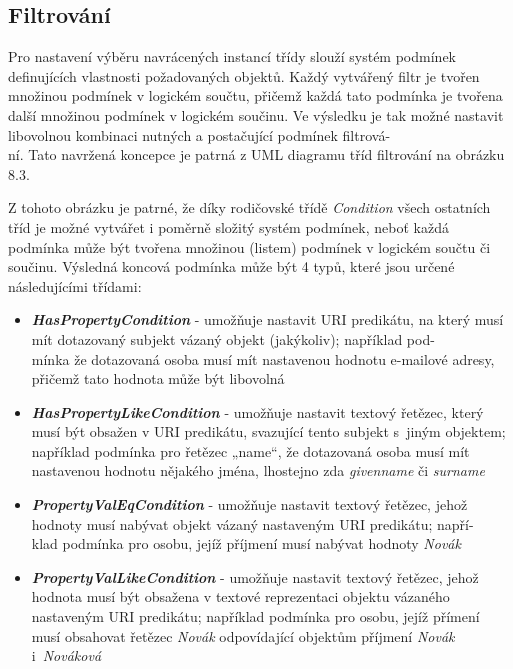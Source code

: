 \documentclass{projekt}
\begin{document}
\subsection{Filtrování}
\hspace{0.65cm}Pro nastavení výběru navrácených instancí třídy slouží systém podmínek definujících vlastnosti požadovaných objektů. Každý vytvářený filtr je tvořen množinou podmínek v logickém součtu, přičemž každá tato podmínka je tvořena další množinou podmínek v logickém součinu. Ve výsledku je tak možné nastavit libovolnou kombinaci nutných a postačující podmínek filtrová-\\ní. Tato navržená koncepce je patrná z UML diagramu tříd filtrování na obrázku 8.3.

Z tohoto obrázku je patrné, že díky rodičovské třídě {\it Condition} všech ostatních tříd je možné vytvářet i poměrně složitý systém podmínek, neboť každá podmínka může být tvořena množinou (listem) podmínek v logickém součtu či součinu. Výsledná koncová podmínka může být 4 typů, které jsou určené následujícími třídami:

\begin{itemize}
\item {\it \bf HasPropertyCondition} - umožňuje nastavit URI predikátu, na který musí mít dotazovaný 
subjekt vázaný objekt (jakýkoliv); například pod-\\mínka že dotazovaná osoba musí mít nastavenou hodnotu e-mailové adresy, přičemž tato hodnota může být libovolná

\item {\it \bf HasPropertyLikeCondition} - umožňuje nastavit textový řetězec, který musí být obsažen v URI predikátu, svazující tento subjekt s~jiným objektem; například podmínka pro řetězec „name“, že dotazovaná osoba musí mít nastavenou hodnotu nějakého jména, lhostejno zda {\it givenname} či {\it surname}
\item {\it \bf PropertyValEqCondition} - umožňuje nastavit textový řetězec, jehož hodnoty musí nabývat objekt vázaný nastaveným URI predikátu; napří-\\klad podmínka pro osobu, jejíž příjmení musí nabývat hodnoty {\it Novák}
\item {\it \bf PropertyValLikeCondition} - umožňuje nastavit textový řetězec, jehož hodnota musí být obsažena v textové reprezentaci objektu vázaného nastaveným URI predikátu; například podmínka pro osobu, jejíž přímení musí obsahovat řetězec {\it Novák} odpovídající objektům příjmení {\it Novák} i~{\it Nováková}
\end{itemize}
\end{document}
